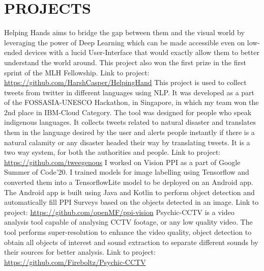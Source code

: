 \documentclass[10pt,a4paper,sans]{moderncv}        %
\begin{document}
\section{PROJECTS}
{Helping Hands aims to bridge the gap between them and the visual world by leveraging the power of Deep Learning which can be made accessible even on low-ended devices with a lucid User-Interface that would exactly allow them to better understand the world around. This project also won the first prize in the first sprint of the MLH Fellowship. Link to project:{\newline}
\url{https://github.com/HarshCasper/HelpingHand}}{}
{This project is used to collect tweets from twitter in different languages using NLP. It was developed as a part of the FOSSASIA-UNESCO Hackathon, in Singapore, in which my team won the 2nd place in IBM-Cloud Category. The tool was designed for people who speak indigenous languages. It collects tweets related to natural disaster and translates them in the language desired by the user and alerts people instantly if there is a natural calamity or any disaster headed their way by translating tweets. It is a two way system, for both the authorities and people.  Link to project:{\newline}
\url{https://github.com/tweegenous}}{}
{I worked on Vision PPI as a part of Google Summer of Code'20. I trained models for image labelling using Tensorflow and converted them into a TensorflowLite model to be deployed on an Android app. The Android app is built using Java and Kotlin to perform object detection and automatically fill PPI Surveys based on the objects detected in an image. Link to project:{\newline}
\url{https://github.com/openMF/ppi-vision}}{}
{Psychic-CCTV is a video analysis tool capable of analysing CCTV footage, or any low quality video. The tool performs super-resolution to enhance the video quality, object detection to obtain all objects of interest and sound extraction to separate different sounds by their sources for better analysis. Link to project:{\newline}
\url{https://github.com/Fireboltz/Psychic-CCTV}}{}
\end{document}

